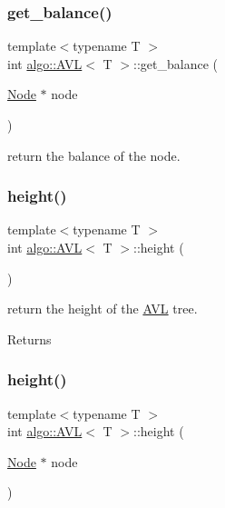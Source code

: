 \subsubsection{\texorpdfstring{get\+\_\+balance()}{get\_balance()}}
{\footnotesize\ttfamily template$<$typename T $>$ \\
int \hyperlink{classalgo_1_1_a_v_l}{algo\+::\+A\+VL}$<$ T $>$\+::get\+\_\+balance (\begin{DoxyParamCaption}\item[{\hyperlink{structalgo_1_1_a_v_l_1_1_node}{Node} $\ast$}]{node }\end{DoxyParamCaption})\hspace{0.3cm}{\ttfamily [inline]}}

return the balance of the node. \mbox{\label{classalgo_1_1_a_v_l_af66028b5b5d5522309c39fc6e257cc29}} 
\subsubsection{\texorpdfstring{height()}{height()}\hspace{0.1cm}{\footnotesize\ttfamily [1/2]}}
{\footnotesize\ttfamily template$<$typename T $>$ \\
int \hyperlink{classalgo_1_1_a_v_l}{algo\+::\+A\+VL}$<$ T $>$\+::height (\begin{DoxyParamCaption}{ }\end{DoxyParamCaption})\hspace{0.3cm}{\ttfamily [inline]}}

return the height of the \hyperlink{classalgo_1_1_a_v_l}{A\+VL} tree. \begin{DoxyReturn}{Returns}

\end{DoxyReturn}
\mbox{\label{classalgo_1_1_a_v_l_a2a7302a4158b1d05ec14a72ffe334967}} 
\subsubsection{\texorpdfstring{height()}{height()}\hspace{0.1cm}{\footnotesize\ttfamily [2/2]}}
{\footnotesize\ttfamily template$<$typename T $>$ \\
int \hyperlink{classalgo_1_1_a_v_l}{algo\+::\+A\+VL}$<$ T $>$\+::height (\begin{DoxyParamCaption}\item[{\hyperlink{structalgo_1_1_a_v_l_1_1_node}{Node} $\ast$}]{node }\end{DoxyParamCaption})\hspace{0.3cm}{\ttfamily [inline]}}

